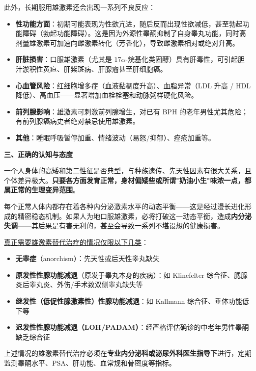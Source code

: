 此外，长期服用雄激素还会出现一系列不良反应：
\begin{itemize}
	\item \textbf{性功能方面}：初期可能表现为性欲亢进，随后反而出现性欲减低，甚至勃起功能障碍（勃起功能障碍）。这是因为外源性睾酮抑制了自身睾丸功能，同时高剂量雄激素可加速向雌激素转化（芳香化），导致雌激素相对或绝对升高。
	\item \textbf{肝脏损害}：口服雄激素（尤其是 $17\alpha$-烷基化类固醇）具有肝毒性，可引起胆汁淤积性黄疸、肝紫斑病、肝腺瘤甚至肝细胞癌。
	\item \textbf{心血管风险}：红细胞增多症（血液黏稠度升高）、血脂异常（LDL 升高 / HDL 降低）、高血压——显著增加血栓栓塞和动脉粥样硬化风险。
	\item \textbf{前列腺影响}：雄激素可刺激前列腺增生，对已有 BPH 的老年男性尤其危险；有前列腺癌病史者绝对禁忌使用雄激素。
	\item \textbf{其他}：睡眠呼吸暂停加重、情绪波动（易怒/抑郁）、痤疮加重等。
\end{itemize}

\vspace{0.5em}
\noindent\textbf{三、正确的认知与态度}

一个人身体的高矮和第二性征是否典型，与种族遗传、先天性因素有很大关系，且个体差异极大。\textbf{只要各方面发育正常，身材偏矮些或所谓"奶油小生"味浓一点，都属正常的生理变异范围}。

每个正常人体内都存在着各种内分泌激素水平的动态平衡——这是经过漫长进化形成的精密稳态机制。如果人为地口服雄激素，必将打破这一动态平衡，造成\textbf{内分泌失调}——其后果是有害无利的，甚至会导致一系列不堪设想的健康损害。

\vspace{0.3em}
\underline{真正需要雄激素替代治疗的情况仅限以下几类}：
\begin{itemize}
	\item \textbf{无睾症}（anorchism）：先天性或后天性睾丸缺失
	\item \textbf{原发性性腺功能减退}（原发于睾丸本身的疾病）：如 Klinefelter 综合征、腮腺炎后睾丸炎、外伤/手术致双侧睾丸缺失等
	\item \textbf{继发性（低促性腺激素性）性腺功能减退}：如 Kallmann 综合征、垂体功能低下等
	\item \textbf{迟发性性腺功能减退（LOH/PADAM）}：经严格评估确诊的中老年男性睾酮缺乏综合征
\end{itemize}

上述情况的雄激素替代治疗必须在\textbf{专业内分泌科或泌尿外科医生指导下}进行，定期监测睾酮水平、PSA、肝功能、血常规和骨密度等指标。

